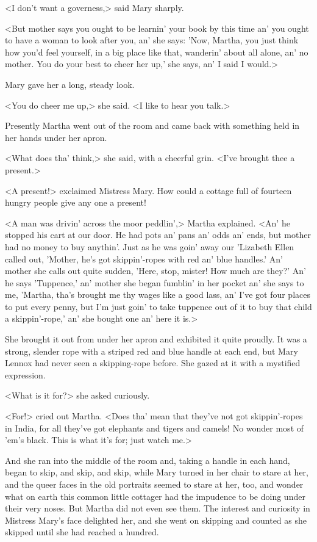 <I don't want a governess,> said Mary sharply.

<But mother says you ought to be learnin' your book by this time an' you ought to have a woman to look after you, an' she says: 'Now, Martha, you just think how you'd feel yourself, in a big place like that, wanderin' about all alone, an' no mother. You do your best to cheer her up,' she says, an' I said I would.>

Mary gave her a long, steady look.

<You do cheer me up,> she said. <I like to hear you talk.>

Presently Martha went out of the room and came back with something held in her hands under her apron.

<What does tha' think,> she said, with a cheerful grin. <I've brought thee a present.>

<A present!> exclaimed Mistress Mary. How could a cottage full of fourteen hungry people give any one a present!

<A man was drivin' across the moor peddlin',> Martha explained. <An' he stopped his cart at our door. He had pots an' pans an' odds an' ends, but mother had no money to buy anythin'. Just as he was goin' away our 'Lizabeth Ellen called out, 'Mother, he's got skippin'-ropes with red an' blue handles.' An' mother she calls out quite sudden, 'Here, stop, mister! How much are they?' An' he says 'Tuppence,' an' mother she began fumblin' in her pocket an' she says to me, 'Martha, tha's brought me thy wages like a good lass, an' I've got four places to put every penny, but I'm just goin' to take tuppence out of it to buy that child a skippin'-rope,' an' she bought one an' here it is.>

She brought it out from under her apron and exhibited it quite proudly. It was a strong, slender rope with a striped red and blue handle at each end, but Mary Lennox had never seen a skipping-rope before. She gazed at it with a mystified expression.

<What is it for?> she asked curiously.

<For!> cried out Martha. <Does tha' mean that they've not got skippin'-ropes in India, for all they've got elephants and tigers and camels! No wonder most of 'em's black. This is what it's for; just watch me.>

And she ran into the middle of the room and, taking a handle in each hand, began to skip, and skip, and skip, while Mary turned in her chair to stare at her, and the queer faces in the old portraits seemed to stare at her, too, and wonder what on earth this common little cottager had the impudence to be doing under their very noses. But Martha did not even see them. The interest and curiosity in Mistress Mary's face delighted her, and she went on skipping and counted as she skipped until she had reached a hundred.

